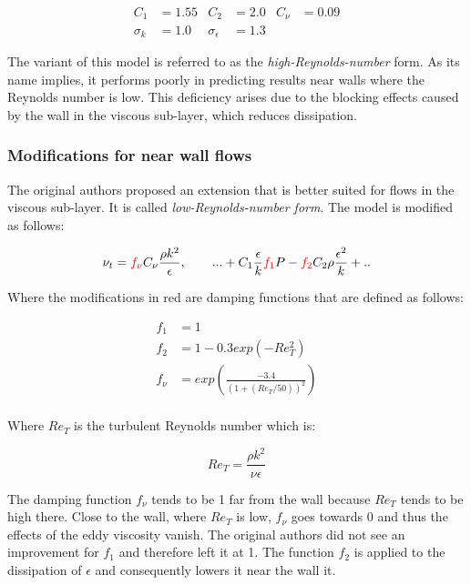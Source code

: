 \begin{align*}
    C_1 &= 1.55         & C_2               &= 2.0  & C_{\nu} &= 0.09\\
    \sigma_k &= 1.0     & \sigma_{\epsilon} &= 1.3
\end{align*}

\noindent The variant of this model is referred to as the
\textit{high-Reynolds-number} form. As its name implies, it performs poorly in
predicting results near walls where the Reynolds number is low. This deficiency
arises due to the blocking effects caused by the wall in the viscous sub-layer,
which reduces dissipation.


\subsubsection{Modifications for near wall flows}
The original authors proposed an extension that is better suited for flows in
the viscous sub-layer. It is called \textit{low-Reynolds-number form}. The
model is modified as follows:

\begin{align}
    \nu_t = \textcolor{red}{f_{\nu}} C_{\nu} \frac{\rho k^2}{\epsilon},  \qquad
%
    ... + C_1 \frac{\epsilon}{k}\textcolor{red}{f_1} P 
    - \textcolor{red}{f_2} C_2 \rho \frac{\epsilon^2}{k} + ..
\end{align}

\noindent Where the modifications in red are damping functions that are defined
as follows:

\begin{align}
    f_1 &= 1 \\
    f_2 &= 1 - 0.3 exp(-Re_T^2) \\
    f_{\nu} &= exp \left( \frac{-3.4}{(1 + (Re_T/50))^2}\right) \\
\end{align}

\noindent Where $Re_T$ is the turbulent Reynolds number which is:

\begin{equation}
    Re_T = \frac{\rho k^2}{\nu \epsilon} 
\end{equation}

\noindent The damping function $f_{\nu}$ tends to be 1 far from the wall
because $Re_T$ tends to be high there. Close to the wall, where $Re_T$ is low,
$f_{\nu}$ goes towards 0 and thus the effects of the eddy viscosity vanish. The
original authors did not see an improvement for $f_1$ and therefore left it at
1. The function $f_2$ is applied to the dissipation of $\epsilon$ and
consequently lowers it near the wall it.


